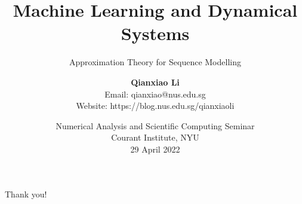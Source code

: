 \documentclass[t,11pt,aspectratio=1610]{beamer}
\title{Machine Learning and Dynamical Systems}
\subtitle{Approximation Theory for Sequence Modelling}
\author[shortname]{
    \textbf{Qianxiao Li}
    {
        \small \\
        \color{nusblue} Email: qianxiao@nus.edu.sg \\
        \color{nusblue} Website: https://blog.nus.edu.sg/qianxiaoli
        \normalsize
    }
}
\date{
    Numerical Analysis and Scientific Computing Seminar \\
    Courant Institute, NYU \\
    29 April 2022
}
\begin{document}
    \begin{frame}
        \maketitle
    \end{frame}


    
    
    
    
    

    \begin{frame}[focus]
        Thank you!
    \end{frame}
\end{document}
